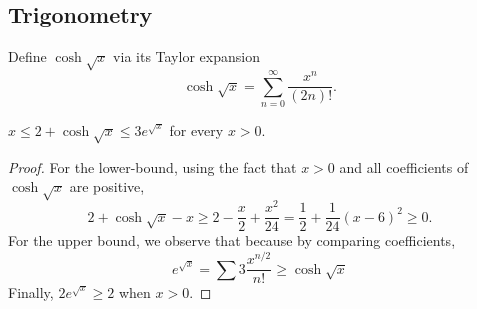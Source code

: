 
\begin{definition}[Books]
  \label{def:book}
\end{definition}


\subsection{Trigonometry}

\begin{definition}
  \label{def:coshsqrt} %
  \leanok
  Define \(\cosh \sqrt{x}\) via its Taylor expansion
  \begin{equation*}
    \cosh\sqrt{x} = \sum_{n = 0}^\infty \frac{x^n}{(2n)!}.
  \end{equation*}
\end{definition}

\begin{lemma}
  \label{lem:coshsqrt-bd-pos}
  \leanok
  \(x \le 2 + \cosh \sqrt{x} \le 3 e^{\sqrt{x}}\) for every \(x > 0\).
\end{lemma}
%
\begin{proof}
  For the lower-bound, using the fact that \(x>0\) and all coefficients of \(\cosh \sqrt{x}\) are positive,
  \begin{equation*}
    2+\cosh \sqrt{x} - x \ge 2 - \frac{x}{2} + \frac{x^2}{24} = \frac{1}{2}+\frac{1}{24}(x-6)^2 \ge 0.
  \end{equation*}
  For the upper bound, we observe that because by comparing coefficients,
  \begin{equation*}
    e^{\sqrt{x}} = \sum 3\frac{x^{n/2}}{n!}  \ge \cosh\sqrt{x}
  \end{equation*}
  Finally, \(2e^{\sqrt{x}}\ge 2\) when \(x>0\).
\end{proof}


